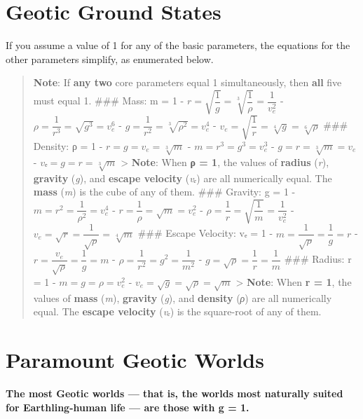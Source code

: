 \documentclass[
  letterpaper,
]{book}
\begin{document}
\section{Geotic Ground States}\label{geotic-ground-states}

If you assume a value of 1 for any of the basic parameters, the
equations for the other parameters simplify, as enumerated below.

\begin{quote}
\textbf{Note}: If \textbf{any two} core parameters equal 1
simultaneously, then \textbf{all} five must equal 1. \#\#\# Mass: m = 1
- \(r=\sqrt{\dfrac{1}{g}}=\sqrt[3]{\dfrac{1}{\rho}}=\dfrac{1}{v_e^2}\) -
\(\rho=\dfrac{1}{r^3}=\sqrt{g^3}=v_e^6\) -
\(g=\dfrac{1}{r^2}=\sqrt[3]{\rho^2}=v_e^4\) -
\(v_e=\sqrt{\dfrac{1}{r}}=\sqrt[4]{g}=\sqrt[6]{\rho}\) \#\#\# Density: ρ
= 1 - \(r = g = v_e = \sqrt[3]{m}\) - \(m=r^3=g^3=v_e^3\) -
\(g=r=\sqrt[3]{m}=v_e\) - \(vₑ=g=r=\sqrt[3]{m}\) \textgreater{}
\textbf{Note}: When \textbf{ρ = 1}, the values of \textbf{radius}
(\emph{r}), \textbf{gravity} (\emph{g}), and \textbf{escape velocity}
(\emph{vₑ}) are all numerically equal. The \textbf{mass}
(\emph{m\hspace{0pt}}) is the cube of any of them. \#\#\# Gravity: g = 1
- \(m=r^2=\dfrac{1}{\rho^2}=v_e^4\) -
\(r=\dfrac{1}{\rho}=\sqrt{m}=v_e^2\) -
\(\rho=\dfrac{1}{r}=\sqrt{\dfrac{1}{m}}=\dfrac{1}{v_e^2}\) -
\(v_e=\sqrt{r}=\dfrac{1}{\sqrt{\rho}}=\sqrt[4]{m}\) \#\#\# Escape
Velocity: vₑ = 1 - \(m=\dfrac{1}{\sqrt{\rho}}=\dfrac{1}{g}=r\) -
\(r=\dfrac{v_e}{\sqrt{\rho}}=\dfrac{1}{g}=m\) -
\(\rho=\dfrac{1}{r^2}=g^2=\dfrac{1}{m^2}\) -
\(g=\sqrt{\rho}=\dfrac{1}{r}=\dfrac{1}{m}\) \#\#\# Radius: r = 1 -
\(m=g=\rho=v_e^2\) - \(v_e=\sqrt{g}=\sqrt{\rho}=\sqrt{m}\)
\textgreater{} \textbf{Note}: When \textbf{r = 1}, the values of
\textbf{mass} (\emph{m}), \textbf{gravity} (\emph{g}), and
\textbf{density} (\emph{ρ}) are all numerically equal. The
\textbf{escape velocity} (\emph{vₑ\hspace{0pt}}) is the square-root of
any of them.
\end{quote}

\section{Paramount Geotic Worlds}\label{paramount-geotic-worlds}

\textbf{The most Geotic worlds --- that is, the worlds most naturally
suited for Earthling-human life --- are those with g = 1.}
\end{document}
